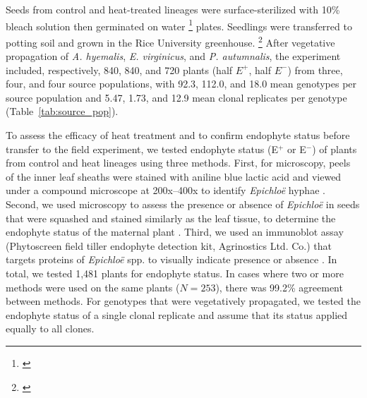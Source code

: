 \documentclass[12pt]{article}\usepackage[]{graphicx}\usepackage[dvipsnames]{xcolor}
\newcommand{\tom}[2]{{\color{red}{#1}}\footnote{\textit{\color{red}{#2}}}}
\begin{document}
Seeds from control and heat-treated lineages were surface-sterilized with 10\% bleach solution then germinated on water \tom{agar}{What percent agar?} plates.
Seedlings were transferred to potting soil and grown in the Rice University greenhouse. 
\tom{Once these plants were sufficiently large they were vegetatively propagated to help meet target sample sizes, with clonal identities tracked across individuals. }{A reviewer may ask why genotype identity was not included as a random effect.}
After vegetative propagation of \textit{A. hyemalis}, \textit{E. virginicus}, and \textit{P. autumnalis}, the experiment included, respectively, 840, 840, and 720 plants (half $E^+$, half $E^-$) from three, four, and four source populations, with 92.3, 112.0, and 18.0 mean genotypes per source population and 5.47, 1.73, and 12.9 mean clonal replicates per genotype (Table~\ref{tab:source_pop}). 

To assess the efficacy of heat treatment and to confirm endophyte status before transfer to the field experiment, we tested endophyte status (E$^+$ or E$^-$) of plants from control and heat lineages using three methods. 
First, for microscopy, peels of the inner leaf sheaths were stained with aniline blue lactic acid and viewed under a compound microscope at 200x–400x to identify \emph{Epichloë} hyphae \citep{jackson1988rapid}. 
Second, we used microscopy to assess the presence or absence of \emph{Epichloë} in seeds that were squashed and stained similarly as the leaf tissue, to determine the endophyte status of the maternal plant \citep{fowler2025increasing}. 
Third, we used an immunoblot assay (Phytoscreen field tiller endophyte detection kit, Agrinostics Ltd. Co.) that targets proteins of \emph{Epichloë} spp. to visually indicate presence or absence \citep{koh2006rapid}. 
In total, we tested 1,481 plants for endophyte status. 
In cases where two or more methods were used on the same plants ($N=253$), there was 99.2\% agreement between methods.
For genotypes that were vegetatively propagated, we tested the endophyte status of a single clonal replicate and assume that its status applied equally to all clones. 
\end{document}

